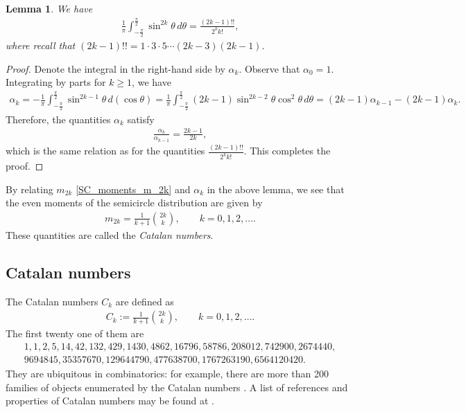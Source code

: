 \documentclass[letterpaper,11pt,oneside,reqno]{amsart}
\numberwithin{equation}{section}
\newtheorem{lemma}[proposition]{Lemma}
\theoremstyle{definition}
\begin{document}
\begin{lemma}
	We have
	\begin{align*}
		\frac{1}{\pi}\int_{-\frac\pi2}^{\frac\pi2}\sin^{2k}\theta\, d\theta=
		\frac{(2k-1)!!}{2^k k!},
	\end{align*}
	where recall that $(2k-1)!!=1\cdot 3\cdot 5\cdots (2k-3)(2k-1)$.
\end{lemma}	
\begin{proof}
	Denote the integral in the right-hand side by $\alpha_{k}$. Observe that $\alpha_0=1$.
	Integrating by parts for $k\ge1$, we have
	\begin{align*}
		\alpha_k=
		-\frac{1}{\pi}\int_{-\frac\pi2}^{\frac\pi2}\sin^{2k-1}\theta\, d(\cos\theta)
		=\frac{1}{\pi}\int_{-\frac\pi2}^{\frac\pi2}
		(2k-1)\sin^{2k-2}\theta\cos^{2}\theta\, d\theta
		=(2k-1)\alpha_{k-1}-(2k-1)\alpha_{k}.
	\end{align*}
	Therefore, the quantities $\alpha_k$ satisfy
	\begin{align*}
		\frac{\alpha_k}{\alpha_{k-1}}=\frac{2k-1}{2k},
	\end{align*}
	which is the same relation as for the quantities 
	$\frac{(2k-1)!!}{2^k k!}$.
	This completes the proof.		
\end{proof}
By relating $m_{2k}$ \eqref{SC_moments_m_2k} and $\alpha_k$ in the above lemma,
we see that the even moments of the semicircle distribution are given by 
\begin{align}\label{m_2k_Catalan}
	m_{2k}=\frac{1}{k+1}\binom{2k}{k},\qquad k=0,1,2,\ldots.
\end{align}
These quantities are called the \emph{Catalan numbers}.


\subsection{Catalan numbers} %
\label{sub:catalan_numbers}

The Catalan numbers $C_k$ are defined as
\begin{align}\label{Catalan_def}
	C_k:=\frac{1}{k+1}\binom{2k}{k},\qquad
	k=0,1,2,\ldots.
\end{align}
The first twenty one of them are
\begin{align*}
	1,1,2,5,14,42,132,429,1430,4862,16796,58786,208012,742900,2674440,\\9694845,35357670,129644790,477638700,1767263190,6564120420.
\end{align*}
They are ubiquitous in combinatorics: for
example, there are more than 200 families of objects  enumerated by the
Catalan numbers \cite{stanley2015catalan}. A list of references and
properties of Catalan numbers may be found at \cite{CatalanOEIS}.
\end{document}
